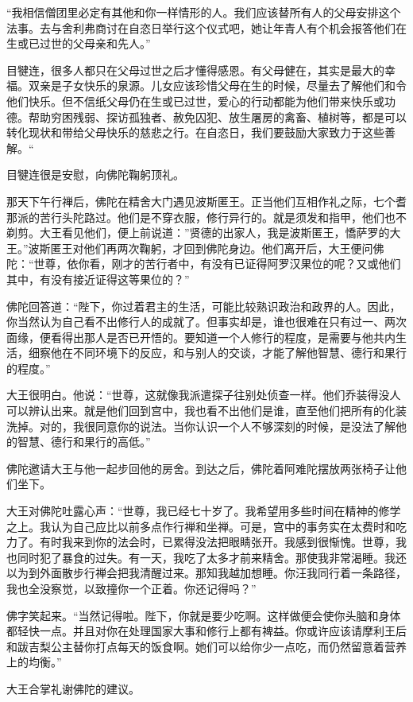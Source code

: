 \documentclass[12pt,twoside,openany]{book}
\begin{document}
“我相信僧团里必定有其他和你一样情形的人。我们应该替所有人的父母安排这个法事。去与舍利弗商讨在自恣日举行这个仪式吧，她让年青人有个机会报答他们在生或已过世的父母亲和先人。”

目犍连，很多人都只在父母过世之后才懂得感恩。有父母健在，其实是最大的幸福。双亲是子女快乐的泉源。儿女应该珍惜父母在生的时候，尽量去了解他们和令他们快乐。但不信纸父母仍在生或已过世，爱心的行动都能为他们带来快乐或功德。帮助穷困残弱、探访孤独者、赦免囚犯、放生屠房的禽畜、植树等，都是可以转化现状和带给父母快乐的慈悲之行。在自恣日，我们要鼓励大家致力于这些善解。“

目犍连很是安慰，向佛陀鞠躬顶礼。

那天下午行禅后，佛陀在精舍大门遇见波斯匿王。正当他们互相作礼之际，七个耆那派的苦行头陀路过。他们是不穿衣服，修行异行的。就是须发和指甲，他们也不剃剪。大王看见他们，便上前说道：”贤德的出家人，我是波斯匿王，憍萨罗的大王。”波斯匿王对他们再两次鞠躬，才回到佛陀身边。他们离开后，大王便问佛陀：“世尊，依你看，刚才的苦行者中，有没有已证得阿罗汉果位的呢？又或他们其中，有没有接近证得这等果位的？”

佛陀回答道：“陛下，你过着君主的生活，可能比较熟识政治和政界的人。因此，你当然认为自己看不出修行人的成就了。但事实却是，谁也很难在只有过一、两次面缘，便看得出那人是否已开悟的。要知道一个人修行的程度，是需要与他共内生活，细察他在不同环境下的反应，和与别人的交谈，才能了解他智慧、德行和果行的程度。”

大王很明白。他说：“世尊，这就像我派遣探子往别处侦查一样。他们乔装得没人可以辨认出来。就是他们回到宫中，我也看不出他们是谁，直至他们把所有的化装洗掉。对的，我很同意你的说法。当你认识一个人不够深刻的时候，是没法了解他的智慧、德行和果行的高低。”

佛陀邀请大王与他一起步回他的房舍。到达之后，佛陀着阿难陀摆放两张椅子让他们坐下。

大王对佛陀吐露心声：“世尊，我已经七十岁了。我希望用多些时间在精神的修学之上。我认为自己应比以前多点作行禅和坐禅。可是，宫中的事务实在太费时和吃力了。有时我来到你的法会时，已累得没法把眼睛张开。我感到很惭愧。世尊，我也同时犯了暴食的过失。有一天，我吃了太多才前来精舍。那使我非常渴睡。我还以为到外面散步行禅会把我清醒过来。那知我越加想睡。你汪我同行着一条路径，我也全没察觉，以致撞你一个正着。你还记得吗？”

佛字笑起来。“当然记得啦。陛下，你就是要少吃啊。这样做便会使你头脑和身体都轻快一点。并且对你在处理国家大事和修行上都有裨益。你或许应该请摩利王后和跋吉梨公主替你打点每天的饭食啊。她们可以给你少一点吃，而仍然留意着营养上的均衡。”

大王合掌礼谢佛陀的建议。
\end{document}
